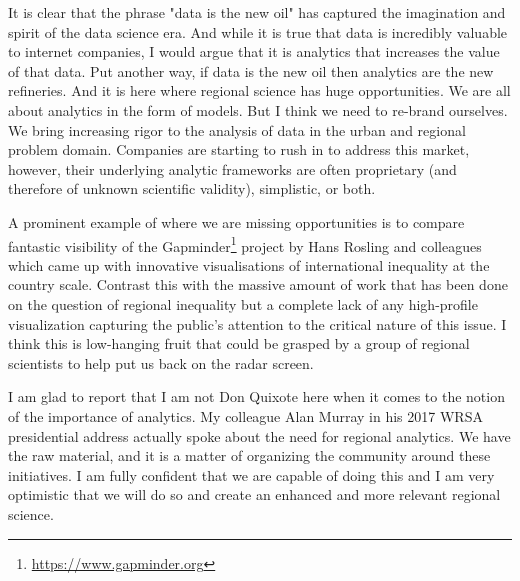 \documentclass[11pt]{article}
\begin{document}
It is clear that the phrase "data is the new oil" has captured the imagination
and spirit of the data science era. And while it is true that data is incredibly
valuable to internet companies, I would argue that it is analytics that
increases the value of that data. Put another way, if data is the new oil then
analytics are the new refineries. And it is here where regional science has huge
opportunities. We are all about analytics in the form of models. But I think we
need to re-brand ourselves. We bring increasing rigor to the analysis of data in
the urban and regional problem domain.  Companies are starting to rush in
to address this market, however, their underlying analytic frameworks are often
proprietary (and therefore of unknown scientific validity), simplistic, or both.

A prominent example of where we are missing opportunities is to compare
fantastic visibility of the Gapminder\footnote{\url{https://www.gapminder.org}} project by
Hans Rosling and colleagues which came up with innovative visualisations of
international inequality at the country scale. Contrast this with the massive
amount of work that has been done on the question of regional inequality but
a complete lack of any high-profile visualization capturing the public's
attention to the critical nature of this issue. I think this is low-hanging
fruit that could be grasped by a group of regional scientists to help put
us back on the radar screen.


I am glad to report that I am not Don Quixote here when it comes to the notion
of the importance of analytics. My colleague Alan Murray in his 2017 WRSA
presidential address \citep{Murray_2017_ars} actually spoke about the need for
regional analytics. We have the raw material, and it is a matter of organizing the
community around these initiatives. I am fully confident that we are capable of doing
this and I am very optimistic that we will do so and create an enhanced and 
more relevant regional science.



\end{document}
